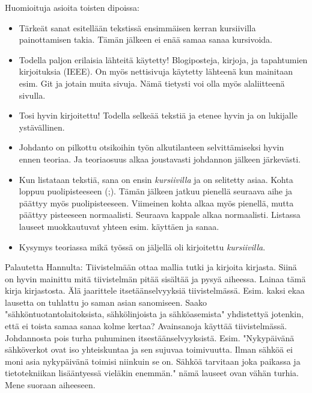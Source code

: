 \begin{it}
	Huomioituja asioita toisten dipoissa:
	\begin{itemize}
		\item Tärkeät sanat esitellään tekstissä ensimmäisen kerran kursiivilla painottamisen takia. Tämän jälkeen ei enää samaa sanaa kursivoida.
		\item Todella paljon erilaisia lähteitä käytetty! Blogiposteja, kirjoja, ja tapahtumien kirjoituksia (IEEE). On myös nettisivuja käytetty lähteenä kun mainitaan esim. Git ja jotain muita sivuja. Nämä tietysti voi olla myös alaliitteenä sivulla.
		\item Tosi hyvin kirjoitettu! Todella selkeää tekstiä ja etenee hyvin ja on lukijalle ystävällinen.
		\item Johdanto on pilkottu otsikoihin työn alkutilanteen selvittämiseksi hyvin ennen teoriaa. Ja teoriaosuus alkaa joustavasti johdannon jälkeen järkevästi.
		\item Kun listataan tekstiä, sana on ensin \emph{kursiivilla} ja on selitetty asiaa. Kohta loppuu puolipisteeseen (;). Tämän jälkeen jatkuu pienellä seuraava aihe ja päättyy myös puolipisteeseen. Viimeinen kohta alkaa myös pienellä, mutta päättyy pisteeseen normaalisti. Seuraava kappale alkaa normaalisti. Listassa lauseet muokkautuvat yhteen esim. käyttäen ja sanaa.
		\item Kysymys teoriassa mikä työssä on jäljellä oli kirjoitettu \emph{kursiivilla}.
	\end{itemize}
	
	Palautetta Hannulta:
	Tiivistelmään ottaa mallia tutki ja kirjoita kirjasta. Siinä on hyvin mainittu mitä tiivistelmän pitää sisältää ja pysyä aiheessa. Lainaa tämä kirja kirjastosta.
	Älä jaarittele itsetäänselvyyksiä tiivistelmässä. Esim. kaksi ekaa lausetta on tuhlattu jo saman asian sanomiseen.
	Saako "sähköntuotantolaitoksista, sähkölinjoista ja sähköasemista" yhdistettyä jotenkin, että ei toista samaa sanaa kolme kertaa?
	Avainsanoja käyttää tiivistelmässä.
	Johdannosta pois turha puhuminen itsestäänselvyyksistä. Esim. "Nykypäivänä sähköverkot ovat iso yhteiskuntaa ja sen sujuvaa toimivuutta. Ilman sähköä ei moni asia nykypäivänä toimisi niinkuin se on. Sähköä tarvitaan joka paikassa ja tietotekniikan lisääntyessä vieläkin enemmän." nämä lauseet ovan vähän turhia. Mene suoraan aiheeseen.
\end{it}
